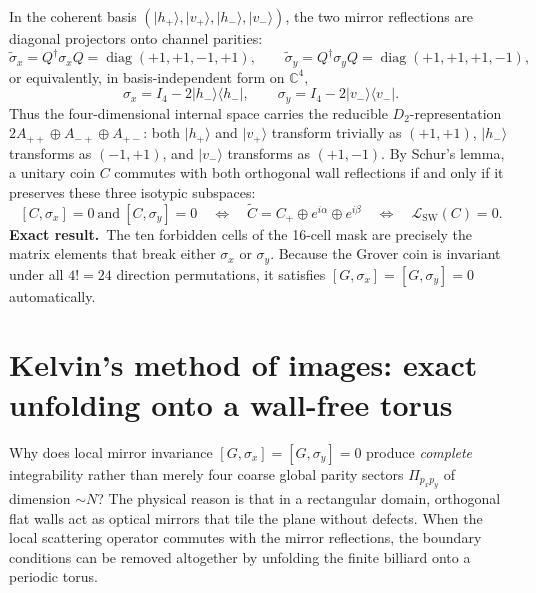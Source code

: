 \documentclass[11pt,a4paper,oneside]{report}
\newcommand{\ket}[1]{\lvert #1\rangle}
\newcommand{\bra}[1]{\langle #1\rvert}
\newcommand{\Id}{I}
\newcommand{\diag}{\operatorname{diag}}
\newcommand{\sw}{\mathrm{SW}}
\newcommand{\exact}{\textbf{Exact result.}\ }
\numberwithin{equation}{chapter}
\begin{document}
In the coherent basis \((\ket{h_+},\ket{v_+},\ket{h_-},\ket{v_-})\),
the two mirror reflections are diagonal projectors onto channel parities:
\begin{equation}
\widetilde\sigma_x=Q^\dagger\sigma_x Q=\diag(+1,+1,-1,+1),
\qquad
\widetilde\sigma_y=Q^\dagger\sigma_y Q=\diag(+1,+1,+1,-1),
\end{equation}
or equivalently, in basis-independent form on \(\mathbb C^4\),
\begin{equation}
\boxed{
\sigma_x=\Id_4-2\ket{h_-}\bra{h_-},\qquad
\sigma_y=\Id_4-2\ket{v_-}\bra{v_-}.
}
\label{eq:sigmaproj}
\end{equation}
Thus the four-dimensional internal space carries the reducible
\(D_2\)-representation \(2A_{++}\oplus A_{-+}\oplus A_{+-}\): both
\(\ket{h_+}\) and \(\ket{v_+}\) transform trivially as \((+1,+1)\),
\(\ket{h_-}\) transforms as \((-1,+1)\), and \(\ket{v_-}\) transforms as
\((+1,-1)\). By Schur's lemma, a unitary coin \(C\) commutes with both
orthogonal wall reflections if and only if it preserves these three
isotypic subspaces:
\begin{equation}
\boxed{
[C,\sigma_x]=0\ \text{and}\ [C,\sigma_y]=0
\quad\Longleftrightarrow\quad
\widetilde C=C_+\oplus e^{i\alpha}\oplus e^{i\beta}
\quad\Longleftrightarrow\quad
\mathcal L_{\sw}(C)=0.
}
\label{eq:schursw}
\end{equation}
\exact The ten forbidden cells of the 16-cell mask are precisely the matrix
elements that break either \(\sigma_x\) or \(\sigma_y\). Because the Grover
coin is invariant under all \(4!=24\) direction permutations, it satisfies
\([G,\sigma_x]=[G,\sigma_y]=0\) automatically.

\section{Kelvin's method of images: exact unfolding onto a wall-free torus}
\label{sec:images}

Why does local mirror invariance \([G,\sigma_x]=[G,\sigma_y]=0\) produce
\emph{complete} integrability rather than merely four coarse global parity
sectors \(\Pi_{p_xp_y}\) of dimension \(\sim N\)? The physical reason is
that in a rectangular domain, orthogonal flat walls act as optical mirrors
that tile the plane without defects. When the local scattering operator
commutes with the mirror reflections, the boundary conditions can be
removed altogether by unfolding the finite billiard onto a periodic torus.
\end{document}
